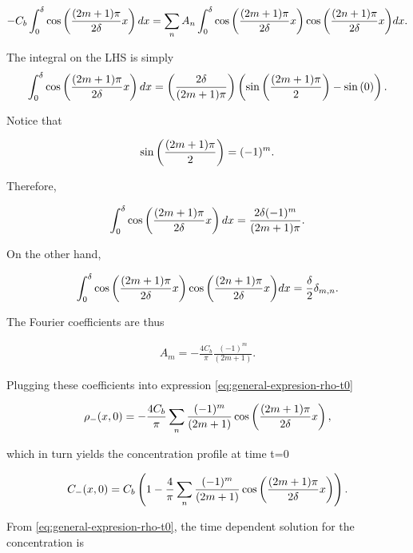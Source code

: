 \begin{align}
	-C_b\int_0^\delta \cos\left({\frac{(2m+1)\pi}{2\delta} x}\right) dx  = \sum_{n}A_n\int_0^\delta {\cos \left({\frac{(2m+1)\pi}{2\delta} x}\right) \cos \left({\frac{(2n+1)\pi}{2\delta}x}\right)  } dx.
	\label{eq:using-cos-orthogonality}
\end{align}


The integral on the LHS is simply
\begin{align}
	\int_0^\delta \cos\left({\frac{(2m+1)\pi}{2\delta} x}\right) dx = \left({\frac{2\delta}{(2m+1)\pi}}\right)\left({\sin\left({\frac{(2m+1)\pi}{2}}\right)-\sin\left({0}\right)}\right).
	\label{eq:cos-integral}
\end{align}

Notice that

\begin{align}
	\sin\left({\frac{(2m+1)\pi}{2}}\right) = (-1)^m.
\end{align}


Therefore,

\begin{align}
	\int_0^\delta \cos\left({\frac{(2m+1)\pi}{2\delta} x}\right) dx = \frac{2\delta(-1)^m}{(2m+1)\pi}.
\end{align}

On the other hand, 

\begin{align}
	\int_0^\delta {\cos \left({\frac{(2m+1)\pi}{2\delta} x}\right) \cos \left({\frac{(2n+1)\pi}{2\delta}x}\right)  } dx = \frac{\delta}{2}\delta_{m,n}.
\end{align}

The Fourier coefficients are thus

\begin{align}
	A_m = -\frac{4C_b}{\pi}\frac{(-1)^m}{(2m+1)}.
\end{align}


Plugging these coefficients into expression \ref{eq:general-expresion-rho-t0}

\begin{align}
	\rho_-(x,0) = -\frac{4C_b}{\pi} \sum_n \frac{(-1)^m}{(2m+1)}\cos\left({\frac{(2m+1)\pi}{2\delta} x}\right),
\end{align}

which in turn yields the concentration profile at time t=0

\begin{align}
	C_-(x,0) = C_b\left({1-\frac{4}{\pi} \sum_n \frac{(-1)^m}{(2m+1)}\cos\left({\frac{(2m+1)\pi}{2\delta} x}\right)}\right).
\end{align}


From \ref{eq:general-expresion-rho-t0}, the time dependent solution for the concentration is

